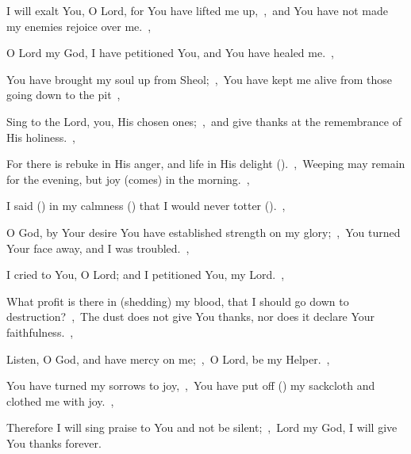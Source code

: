 \documentclass[12pt,twoside,a5paper]{article}
\begin{document}
\begin{normalparskip}
  I will exalt You, O Lord, for You have lifted me up,~\sep\ and You have not made my enemies rejoice over me.~\sep


  O Lord my God, I have petitioned You, and You have healed me.~\sep

  You have brought my soul up from Sheol;~\sep\ You have kept me alive from those going down to the pit~\sep

  Sing to the Lord, you, His chosen ones;~\sep\ and give thanks at the remembrance of His holiness.~\sep

  For there is rebuke in His anger, and life in His delight ().~\sep\ Weeping may remain for the evening, but joy (comes) in the morning.~\sep

  I said () in my calmness () that I would never totter ().~\sep

  O God, by Your desire You have established strength on my glory;~\sep\ You turned Your face away, and I was troubled.~\sep

  I cried to You, O Lord; and I petitioned You, my Lord.~\sep

  What profit is there in (shedding) my blood, that I should go down to destruction?~\sep\ The dust does not give You thanks, nor does it declare Your faithfulness.~\sep

  Listen, O God, and have mercy on me;~\sep\ O Lord, be my Helper.~\sep

  You have turned my sorrows to joy,~\sep\ You have put off () my sackcloth and clothed me with joy.~\sep

  Therefore I will sing praise to You and not be silent;~\sep\ Lord my God, I will give You thanks forever.
\end{normalparskip}




\end{document}
